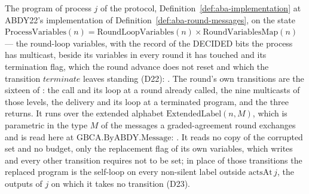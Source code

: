 \begin{definition}
  \label{def:aba-programs}
  \leanok
  The program of process $j$ of the protocol, Definition~\ref{def:aba-implementation} at ABDY22's implementation of Definition~\ref{def:aba-round-messages}, on the state $\mathrm{ProcessVariables}(n) = \mathrm{RoundLoopVariables}(n) \times \mathrm{RoundVariablesMap}(n)$ --- the round-loop variables, with the record of the DECIDED bits the process has multicast, beside its variables in every round it has touched and its termination flag, which the round advance does not reset and which the transition $terminate$ leaves standing (D22): .
  The round's own transitions are the sixteen of : the call and its loop at a round already called, the nine multicasts of those levels, the delivery and its loop at a terminated program, and the three returns.
  It runs over the extended alphabet $\mathrm{ExtendedLabel}(n, M)$, which is parametric in the type $M$ of the messages a graded-agreement round exchanges and is read here at $\mathrm{GBCA.ByABDY.Message}$: .
  It reads no copy of the corrupted set and no budget, only the replacement flag  of its own variables, which  writes and every other transition requires not to be set; in place of those transitions the replaced program is the self-loop  on every non-silent label outside $\mathrm{actsAt}\,j$, the outputs of $j$ on which it takes no transition (D23).
\end{definition}
